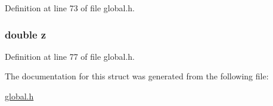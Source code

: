 Definition at line 73 of file global.\-h.

\hypertarget{structcellData_ab3e6ed577a7c669c19de1f9c1b46c872}{
\subsubsection[{z}]{\setlength{\rightskip}{0pt plus 5cm}double z}}\label{structcellData_ab3e6ed577a7c669c19de1f9c1b46c872}


Definition at line 77 of file global.\-h.



The documentation for this struct was generated from the following file\-:\begin{DoxyCompactItemize}
\item 
\hyperlink{global_8h}{global.\-h}\end{DoxyCompactItemize}

